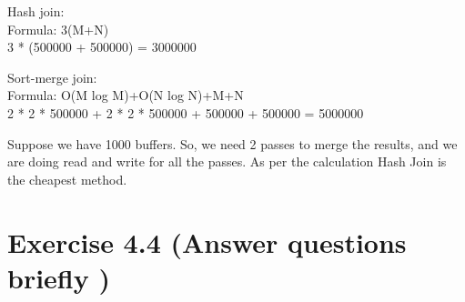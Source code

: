 \documentclass[10pt]{article}
\begin{document}
\begin{enumerate}
		Hash join:\\
		Formula: 3(M+N)\\
		3 * (500000 + 500000) = 3000000
		
		Sort-merge join:\\
		Formula: O(M log M)+O(N log N)+M+N\\
		2 * 2 * 500000 + 2 * 2 * 500000 +  500000 +  500000 = 5000000
		
		Suppose we have 1000 buffers. So, we need 2 passes to merge the results, and we are doing read and write for all the passes.
		As per the calculation Hash Join is the cheapest method.
		
		
		
		
	\end{enumerate}
	
	
	\clearpage
	\section*{Exercise 4.4 (Answer questions briefly )}
	
\end{document}
